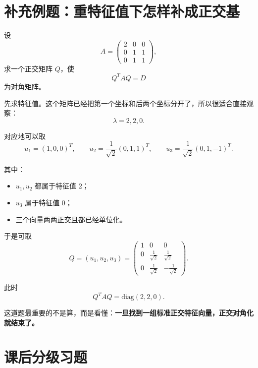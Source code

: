 \documentclass[11pt,oneside,UTF8]{ctexbook}
\newcommand{\important}[1]{\textcolor{Sakura}{\textbf{#1}}}
\begin{document}
\section{补充例题：重特征值下怎样补成正交基}

\begin{examplebox}
设
\[
A=
\begin{pmatrix}
2&0&0\\
0&1&1\\
0&1&1
\end{pmatrix},
\]
求一个正交矩阵 \(Q\)，使
\[
Q^TAQ=D
\]
为对角矩阵。

\tcblower

先求特征值。这个矩阵已经把第一个坐标和后两个坐标分开了，所以很适合直接观察：
\[
\lambda=2,2,0.
\]

对应地可以取
\[
u_1=(1,0,0)^T,\qquad
u_2=\frac{1}{\sqrt2}(0,1,1)^T,\qquad
u_3=\frac{1}{\sqrt2}(0,1,-1)^T.
\]

其中：
\begin{itemize}
  \item \(u_1,u_2\) 都属于特征值 \(2\)；
  \item \(u_3\) 属于特征值 \(0\)；
  \item 三个向量两两正交且都已经单位化。
\end{itemize}

于是可取
\[
Q=(u_1,u_2,u_3)
=
\begin{pmatrix}
1&0&0\\
0&\frac{1}{\sqrt2}&\frac{1}{\sqrt2}\\
0&\frac{1}{\sqrt2}&-\frac{1}{\sqrt2}
\end{pmatrix}.
\]

此时
\[
Q^TAQ=\mathrm{diag}(2,2,0).
\]

这道题最重要的不是算，而是看懂：\important{一旦找到一组标准正交特征向量，正交对角化就结束了。}
\end{examplebox}

\section{课后分级习题}
\end{document}
